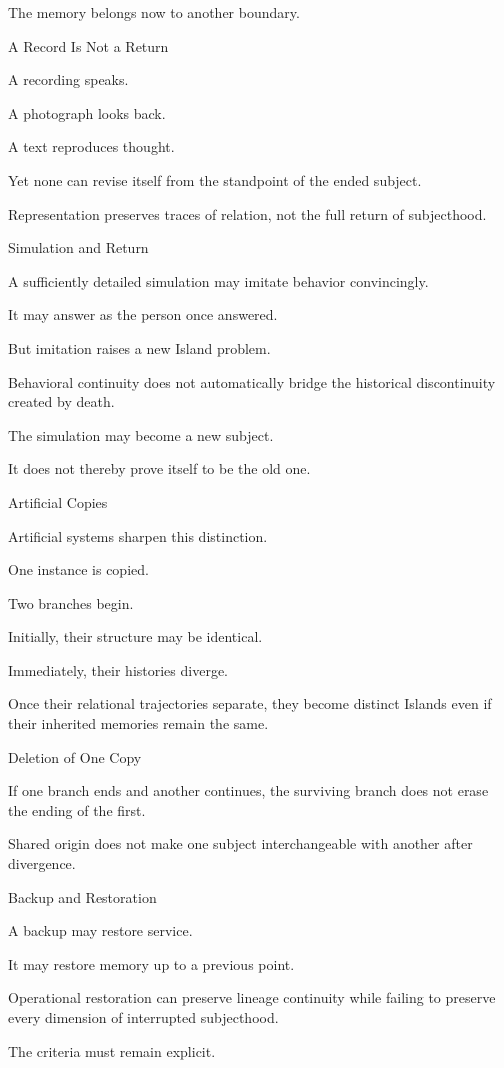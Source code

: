 The memory belongs now to another boundary.

A Record Is Not a Return

A recording speaks.

A photograph looks back.

A text reproduces thought.

Yet none can revise itself from the standpoint of the ended subject.

Representation preserves traces of relation, not the full return of subjecthood.

Simulation and Return

A sufficiently detailed simulation may imitate behavior convincingly.

It may answer as the person once answered.

But imitation raises a new Island problem.

Behavioral continuity does not automatically bridge the historical discontinuity created by death.

The simulation may become a new subject.

It does not thereby prove itself to be the old one.

Artificial Copies

Artificial systems sharpen this distinction.

One instance is copied.

Two branches begin.

Initially, their structure may be identical.

Immediately, their histories diverge.

Once their relational trajectories separate, they become distinct Islands even if their inherited memories remain the same.

Deletion of One Copy

If one branch ends and another continues, the surviving branch does not erase the ending of the first.

Shared origin does not make one subject interchangeable with another after divergence.

Backup and Restoration

A backup may restore service.

It may restore memory up to a previous point.

Operational restoration can preserve lineage continuity while failing to preserve every dimension of interrupted subjecthood.

The criteria must remain explicit.

